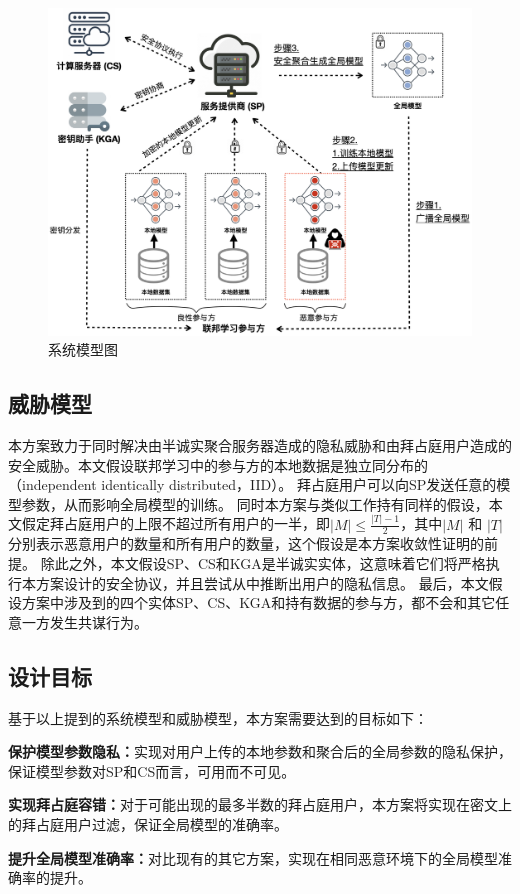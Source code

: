\begin{figure}[htbp]
	\begin{center}
		\includegraphics[width=0.8\linewidth]{figures/keynote-figs/PBFL.png}
		\caption{系统模型图}
		\label{syspnd}
	\end{center}
\end{figure}

\subsection{威胁模型}
本方案致力于同时解决由半诚实聚合服务器造成的隐私威胁和由拜占庭用户造成的安全威胁。本文假设联邦学习中的参与方的本地数据是独立同分布的（independent identically distributed，IID）。
拜占庭用户可以向SP发送任意的模型参数，从而影响全局模型的训练。
同时本方案与类似工作\cite{so2020byzantine, yin2018byzantine, liu2021privacy}持有同样的假设，本文假定拜占庭用户的上限不超过所有用户的一半，即$|M|\leq\frac{|T|-1}{2}$，其中$|M|$ 和 $|T|$ 分别表示恶意用户的数量和所有用户的数量，这个假设是本方案收敛性证明的前提。
除此之外，本文假设SP、CS和KGA是半诚实实体，这意味着它们将严格执行本方案设计的安全协议，并且尝试从中推断出用户的隐私信息。
最后，本文假设方案中涉及到的四个实体SP、CS、KGA和持有数据的参与方，都不会和其它任意一方发生共谋行为。

\subsection{设计目标}
基于以上提到的系统模型和威胁模型，本方案需要达到的目标如下：
\begin{compactitem}
	\item \textbf{保护模型参数隐私：}实现对用户上传的本地参数和聚合后的全局参数的隐私保护，保证模型参数对SP和CS而言，可用而不可见。
	\item \textbf{实现拜占庭容错：}对于可能出现的最多半数的拜占庭用户，本方案将实现在密文上的拜占庭用户过滤，保证全局模型的准确率。
	\item \textbf{提升全局模型准确率：}对比现有的其它方案，实现在相同恶意环境下的全局模型准确率的提升。
\end{compactitem}

